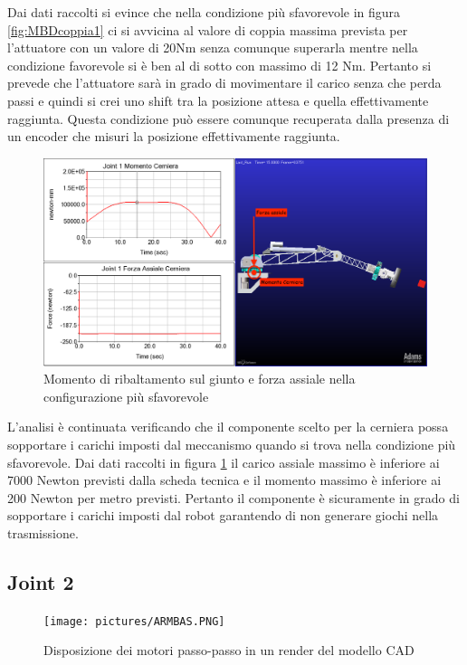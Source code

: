 \documentclass[%
corpo=11pt,
twoside,
 stile=classica,
oldstyle,
greek,%
]{toptesi}
\begin{document}
	
			Dai dati raccolti si evince che nella condizione più sfavorevole in figura \ref{fig:MBDcoppia1}  ci si avvicina al valore di coppia massima prevista per l'attuatore con un valore di 20Nm senza comunque superarla mentre nella condizione favorevole si è ben al di sotto con massimo di 12 Nm. 
			Pertanto si prevede che l'attuatore sarà in grado di movimentare il carico senza che perda passi e quindi si crei uno shift tra la posizione attesa e quella effettivamente raggiunta. Questa condizione può essere comunque recuperata dalla presenza di un encoder che misuri la posizione effettivamente raggiunta. \\
			\begin{figure}
				\centering
				\includegraphics[width=\textwidth]{Plots/BASE/joint1_ralla.png}
				\caption{Momento di ribaltamento sul giunto e forza assiale nella configurazione più sfavorevole}
				\label{fig:MBDralla1}
			\end{figure}
			L'analisi è continuata verificando che il componente scelto per la cerniera possa sopportare i carichi imposti dal meccanismo quando si trova nella condizione più sfavorevole.
			Dai dati raccolti in figura \ref{fig:MBDralla1} il carico assiale massimo è inferiore ai 7000 Newton previsti dalla scheda tecnica e il momento massimo è inferiore ai 200 Newton per metro previsti. Pertanto il componente è sicuramente in grado di sopportare i carichi imposti dal robot garantendo di non generare giochi nella trasmissione. 
			
	
		
		\subsection{Joint 2}
		\begin{figure}
			\centering
			\texttt{[image: pictures/ARMBAS.PNG]}
			\caption{Disposizione dei motori passo-passo in un render del modello CAD}
			\label{fig:Stepper_render}
		\end{figure}
\end{document}
